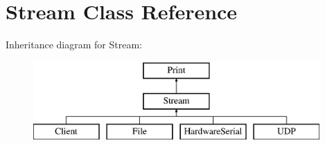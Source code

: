 \hypertarget{class_stream}{\section{Stream Class Reference}
\label{class_stream}
}
Inheritance diagram for Stream\-:\begin{figure}[H]
\begin{center}
\leavevmode
\includegraphics[height=3.000000cm]{class_stream}
\end{center}
\end{figure}
